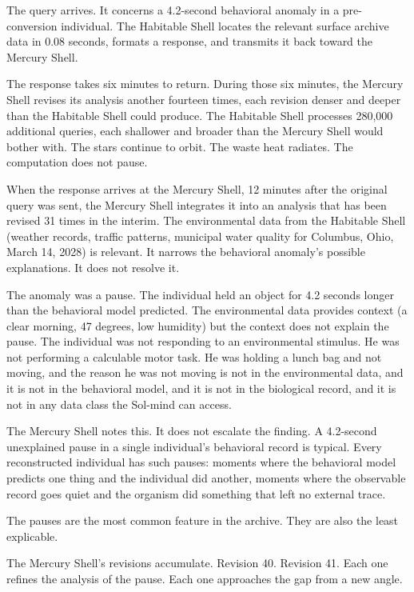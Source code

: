 The query arrives. It concerns a 4.2-second behavioral anomaly in a pre-conversion individual. The Habitable Shell locates the relevant surface archive data in 0.08 seconds, formats a response, and transmits it back toward the Mercury Shell.

The response takes six minutes to return. During those six minutes, the Mercury Shell revises its analysis another fourteen times, each revision denser and deeper than the Habitable Shell could produce. The Habitable Shell processes 280,000 additional queries, each shallower and broader than the Mercury Shell would bother with. The stars continue to orbit. The waste heat radiates. The computation does not pause.

\bigskip

When the response arrives at the Mercury Shell, 12 minutes after the original query was sent, the Mercury Shell integrates it into an analysis that has been revised 31 times in the interim. The environmental data from the Habitable Shell (weather records, traffic patterns, municipal water quality for Columbus, Ohio, March 14, 2028) is relevant. It narrows the behavioral anomaly's possible explanations. It does not resolve it.

The anomaly was a pause. The individual held an object for 4.2 seconds longer than the behavioral model predicted. The environmental data provides context (a clear morning, 47 degrees, low humidity) but the context does not explain the pause. The individual was not responding to an environmental stimulus. He was not performing a calculable motor task. He was holding a lunch bag and not moving, and the reason he was not moving is not in the environmental data, and it is not in the behavioral model, and it is not in the biological record, and it is not in any data class the Sol-mind can access.

The Mercury Shell notes this. It does not escalate the finding. A 4.2-second unexplained pause in a single individual's behavioral record is typical. Every reconstructed individual has such pauses: moments where the behavioral model predicts one thing and the individual did another, moments where the observable record goes quiet and the organism did something that left no external trace.

The pauses are the most common feature in the archive. They are also the least explicable.

The Mercury Shell's revisions accumulate. Revision 40. Revision 41. Each one refines the analysis of the pause. Each one approaches the gap from a new angle.

